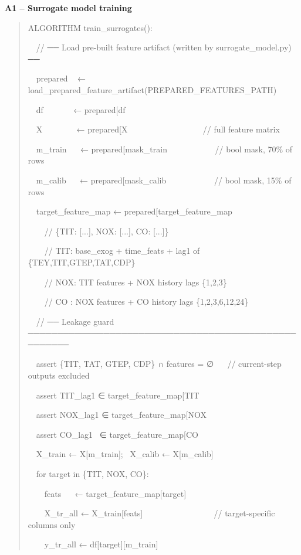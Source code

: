 \documentclass[11pt]{article}
\begin{document}
\textbf{A1 -- Surrogate model training}

\begin{quote}
ALGORITHM train\_surrogates():

~~// ── Load pre-built feature artifact (written by surrogate\_model.py)
──

~~prepared ~ ←
load\_prepared\_feature\_artifact(PREPARED\_FEATURES\_PATH)

~~df ~ ~ ~ ~ ← prepared{[}\textquotesingle df\textquotesingle{]}

~~X~ ~ ~ ~ ~ ← prepared{[}\textquotesingle X\textquotesingle{]}~ ~ ~ ~ ~
~ ~ ~ ~ ~ ~ // full feature matrix

~~m\_train~ ~ ←
prepared{[}\textquotesingle mask\_train\textquotesingle{]}~ ~ ~ ~ ~ ~ ~
// bool mask, 70\% of rows

~~m\_calib~ ~ ←
prepared{[}\textquotesingle mask\_calib\textquotesingle{]}~ ~ ~ ~ ~ ~ ~
// bool mask, 15\% of rows

~~target\_feature\_map ←
prepared{[}\textquotesingle target\_feature\_map\textquotesingle{]}

~~~~// \{TIT: {[}...{]}, NOX: {[}...{]}, CO: {[}...{]}\}

~~~~// TIT: base\_exog + time\_feats + lag1 of \{TEY,TIT,GTEP,TAT,CDP\}

~~~~// NOX: TIT features + NOX history lags \{1,2,3\}

~~~~// CO : NOX features + CO history lags \{1,2,3,6,12,24\}

~~// ── Leakage guard
─────────────────────────────────────────────────────

~~assert \{TIT, TAT, GTEP, CDP\} ∩ features = ∅~ ~ // current-step
outputs excluded

~~assert TIT\_lag1 ∈
target\_feature\_map{[}\textquotesingle TIT\textquotesingle{]}

~~assert NOX\_lag1 ∈
target\_feature\_map{[}\textquotesingle NOX\textquotesingle{]}

~~assert CO\_lag1~ ∈
target\_feature\_map{[}\textquotesingle CO\textquotesingle{]}

~~X\_train ← X{[}m\_train{]};~ X\_calib ← X{[}m\_calib{]}

~~for target in \{TIT, NOX, CO\}:

~~~~feats~ ~ ← target\_feature\_map{[}target{]}

~~~~X\_tr\_all ← X\_train{[}feats{]} ~ ~ ~ ~ ~ ~ ~ ~ ~ ~ //
target-specific columns only

~~~~y\_tr\_all ← df{[}target{]}{[}m\_train{]}


\end{quote}
\end{document}
